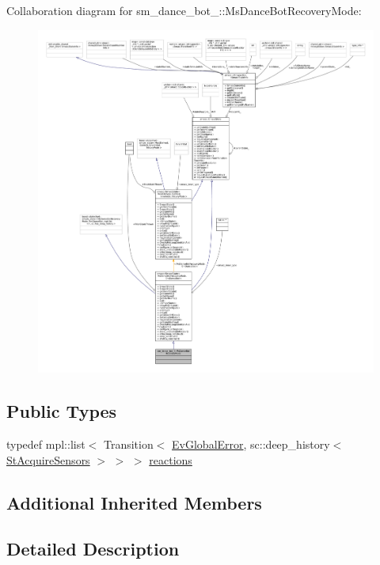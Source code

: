Collaboration diagram for sm\+\_\+dance\+\_\+bot\+\_\+:\+:Ms\+Dance\+Bot\+Recovery\+Mode\+:
\nopagebreak
\begin{figure}[H]
\begin{center}
\leavevmode
\includegraphics[width=350pt]{classsm__dance__bot__3_1_1MsDanceBotRecoveryMode__coll__graph}
\end{center}
\end{figure}
\subsection*{Public Types}
\begin{DoxyCompactItemize}
\item 
typedef mpl\+::list$<$ Transition$<$ \hyperlink{structsm__dance__bot__3_1_1EvGlobalError}{Ev\+Global\+Error}, sc\+::deep\+\_\+history$<$ \hyperlink{structsm__dance__bot__3_1_1StAcquireSensors}{St\+Acquire\+Sensors} $>$ $>$ $>$ \hyperlink{classsm__dance__bot__3_1_1MsDanceBotRecoveryMode_a4e5bd5d1e67102d83d8c0feed79d4c51}{reactions}
\end{DoxyCompactItemize}
\subsection*{Additional Inherited Members}


\subsection{Detailed Description}


